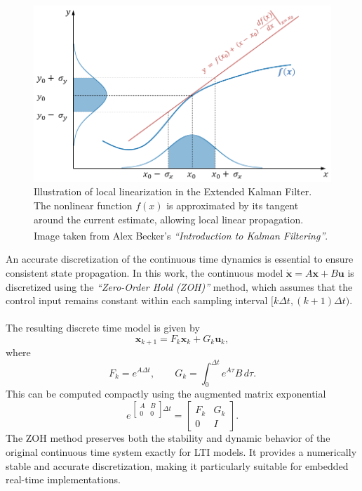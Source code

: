 \begin{figure}[H]
    \centering
    \includegraphics[width=1.0\linewidth]{Pictures/State_Estimation/Extended_Kalman_Filter/Extended_Kalman_Filter_Illustrated.png}
    \caption{Illustration of local linearization in the Extended Kalman Filter. The nonlinear function $f(x)$ is approximated by its tangent around the current estimate, allowing local linear propagation. Image taken from Alex Becker's \textit{``Introduction to Kalman Filtering''}.\textsuperscript{\cite{extended_kalman_filter}}}
    \label{fig:state-estimation-extended-kalman-filter}
\end{figure}
\noindent
An accurate discretization of the continuous time dynamics is essential to ensure consistent state propagation. In this work, the continuous model $\dot{\mathbf{x}} = A\mathbf{x} + B\mathbf{u}$ is discretized using the \textit{``Zero-Order Hold (ZOH)''} method, which assumes that the control input remains constant within each sampling interval $[k\Delta t, (k+1)\Delta t)$.  
\\ \\
The resulting discrete time model is given by
$$
    \mathbf{x}_{k+1} = F_k\mathbf{x}_k + G_k\mathbf{u}_k,
$$
where
$$
    F_k = e^{A\Delta t}, \qquad
    G_k = \int_0^{\Delta t} e^{A\tau}B\,d\tau.
$$
This can be computed compactly using the augmented matrix exponential
$$
    e\,^{
        \begin{bmatrix}
            A & B \\ 
            0 & 0
        \end{bmatrix}
        \Delta t
        }
    =
    \begin{bmatrix}
        F_k & G_k \\
        0 & I
    \end{bmatrix}.
$$
The ZOH method preserves both the stability and dynamic behavior of the original continuous time system exactly for LTI models. It provides a numerically stable and accurate discretization, making it particularly suitable for embedded real-time implementations.  
